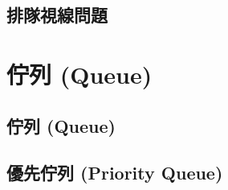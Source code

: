 \documentclass[12pt,a4paper,oneside]{report}
\begin{document}
\begin{CJK}{UTF8}{bkai}
\subsection{排隊視線問題}
\section{佇列 (Queue)}
\subsection{佇列 (Queue)}
\subsection{優先佇列 (Priority Queue)}

\ifx \allfiles \undefined

\printindex[noun]
\clearpage
\end{CJK}
\end{document}
